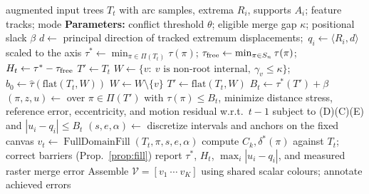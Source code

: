 \begin{algorithm}[H]
\caption{RG-MTM construction with optional relaxation.}\label{alg:pipeline}
\begin{algorithmic}[1]
\Require augmented input trees $T_t$ with arc samples, extrema $R_i$, supports $A_i$; feature tracks; mode
\Statex \textbf{Parameters:} conflict threshold $\theta$; eligible merge gap $\kappa$; positional slack $\beta$
\State $d\gets$ principal direction of tracked extremum displacements;\ $q_i\gets\langle R_i,d\rangle$ scaled to the axis
  \State $\tau^*\gets\min_{\pi\in\Pi(T_t)}\tau(\pi)$; $\tau_{\mathrm{free}}\gets\min_{\pi\in S_n}\tau(\pi)$; $H_t\gets\tau^*-\tau_{\mathrm{free}}$
  \State $T'\gets T_t$
   
    \State $W\gets\{v:\ v\text{ is non-root internal},\ \gamma_v\le\kappa\}$; $b_0\gets\widehat\tau(\mathrm{flat}(T_t,W))$
        \State $W\gets W\setminus\{v\}$
      \EndIf
    \EndFor
    \State $T'\gets\mathrm{flat}(T_t,W)$
  \EndIf
  \State $B_t\gets\tau^*(T')+\beta$ 
  \State $(\pi,z,u)\gets$ over $\pi\in\Pi(T')$ with $\tau(\pi)\le B_t$, minimize distance stress, reference error, eccentricity, and motion residual w.r.t.\ $t-1$ subject to (D)(C)(E) and $|u_i-q_i|\le B_t$ 
  \State $(s,e,\alpha)\gets$ discretize intervals and anchors on the fixed canvas
  \State $v_t\gets\operatorname{FullDomainFill}(T_t,\pi,s,e,\alpha)$ 
    \State compute $C_k,\delta^*(\pi)$ against $T_t$; correct barriers (Prop.~\ref{prop:fill})
  \EndIf
  \State report $\tau^*$, $H_t$, $\max_i|u_i-q_i|$, and measured raster merge error
\EndFor
\State Assemble $\mathcal V=[v_1\ \cdots\ v_K]$ using shared scalar colours; annotate achieved errors
\end{algorithmic}
\end{algorithm}
